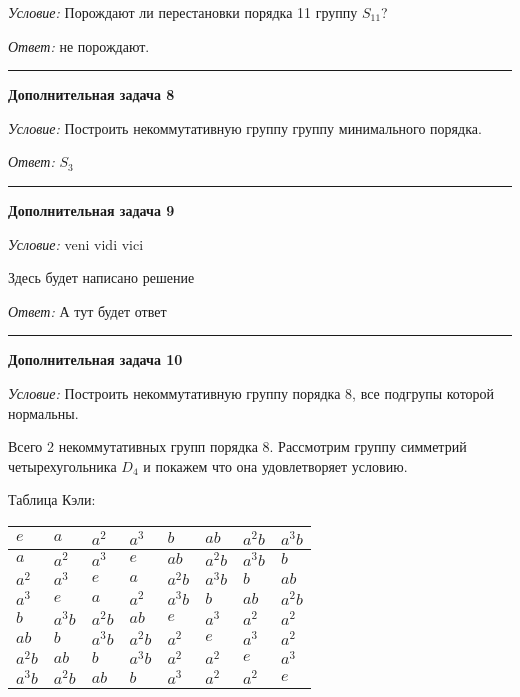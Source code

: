 \documentclass[12pt,a4paper]{article}
\newcommand{\sbs}{\large \bfseries}
\newcommand{\rl}{\vspace{16pt} \hrule \vspace{8pt}}
\begin{document}
{\itshape Условие: } Порождают ли перестановки порядка 11 группу $S_{11}$?



{\itshape Ответ:} не порождают.





\rl
{\sbs Дополнительная задача 8}

{\itshape Условие: } Построить некоммутативную группу группу минимального порядка.



{\itshape Ответ: } $S_3$




\rl
{\sbs Дополнительная задача 9}

{\itshape Условие: } veni vidi vici

Здесь будет написано решение

{\itshape Ответ: } А тут будет ответ




\rl
{\sbs Дополнительная задача 10}

{\itshape Условие: } Построить некоммутативную группу порядка 8, все подгрупы которой нормальны.

Всего 2 некоммутативных групп порядка 8. Рассмотрим группу симметрий четырехугольника $D_4$ и покажем что она удовлетворяет условию.\null

Таблица Кэли:

\begin{center}
\begin{tabular}{|l|l|l|l||l|l|l|l|}
\hline
$e$ & $a$ & $a^2$ & $a^3$ & $b$ & $ab$ & $a^2b$ & $a^3b$\\
\hline
$a$ & $a^2$ & $a^3$ & $e$ & $ab$ & $a^2b$ & $a^3b$ & $b$\\
\hline
$a^2$ & $a^3$ & $e$ & $a$ & $a^2b$ & $a^3b$ & $b$ & $ab$\\
\hline
$a^3$ & $e$ & $a$ & $a^2$ & $a^3b$ & $b$ & $ab$ & $a^2b$\\
\hline
\hline
$b$ & $a^3b$ & $a^2b$ & $ab$ & $e$ & $a^3$ & $a^2$ & $a^2$\\
\hline
$ab$ & $b$ & $a^3b$ & $a^2b$ & $a^2$ & $e$ & $a^3$ & $a^2$\\
\hline
$a^2b$ & $ab$ & $b$ & $a^3b$ & $a^2$ & $a^2$ & $e$ & $a^3$\\
\hline
$a^3b$ & $a^2b$ & $ab$ & $b$ & $a^3$ & $a^2$ & $a^2$ & $e$\\
\hline
\end{tabular}
\end{center}
\end{document}
